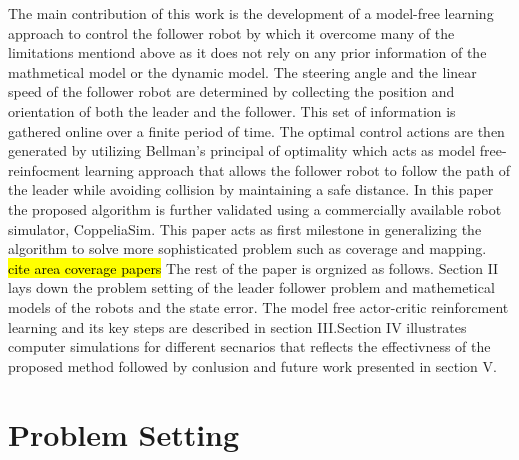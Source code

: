 \documentclass[conference]{IEEEtran}
\begin{document}
The main contribution of this work is the development of a model-free learning approach to control the follower robot by which it overcome many of the limitations mentiond above as it does not rely on any prior information of the mathmetical model or the dynamic model. The steering angle and the linear speed of the follower robot are determined by collecting the position and orientation of both the leader and the follower. This set of information is gathered online over a finite period of time. The optimal control actions are then generated by utilizing Bellman's principal of optimality which acts as model free-reinfocment learning approach that allows the follower robot to follow the path of the leader while avoiding collision by maintaining a safe distance. In this paper the proposed algorithm is further validated using a commercially available robot simulator, CoppeliaSim. This paper acts as first milestone in generalizing the algorithm to solve more sophisticated problem such as coverage and mapping. \hl{cite area coverage papers}  
The rest of the paper is orgnized as follows. Section II lays down the problem setting of the leader follower problem and mathemetical models of the robots and the state error. The model free actor-critic reinforcment learning and its key steps are described in section III.Section IV illustrates computer simulations for different secnarios that reflects the effectivness of the proposed method followed by conlusion and future work presented in section V.      

\section{Problem Setting} 
\label{sec:problemSetting}
\end{document}
